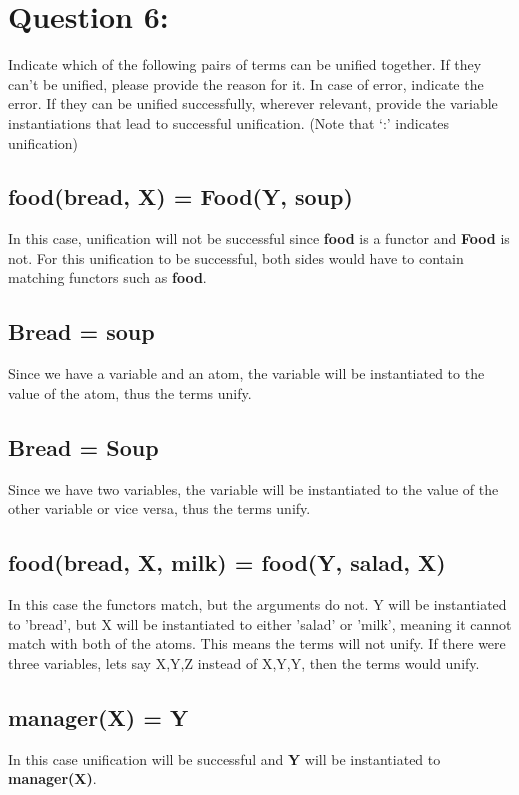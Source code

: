 \section{Question 6:}
Indicate which of the following pairs of terms can be uniﬁed together. If they can’t be uniﬁed, please provide the reason for it. In case of error, indicate the error. If they can be uniﬁed successfully, wherever relevant, provide the variable instantiations that lead to successful uniﬁcation. (Note that ‘:’ indicates uniﬁcation)

\subsection{food(bread, X) = Food(Y, soup)}
In this case, unification will not be successful since \textbf{food} is a functor and \textbf{Food} is not. For this unification to be successful, both sides would have to contain matching functors such as \textbf{food}.

\subsection{Bread = soup}
Since we have a variable and an atom, the variable will be instantiated to the value of the atom, thus the terms unify.

\subsection{Bread = Soup}
Since we have two variables, the variable will be instantiated to the value of the other variable or vice versa, thus the terms unify.

\subsection{food(bread, X, milk) = food(Y, salad, X)}
In this case the functors match, but the arguments do not. Y will be instantiated to 'bread', but X will be instantiated to either 'salad' or 'milk', meaning it cannot match with both of the atoms. This means the terms will not unify. If there were three variables, lets say X,Y,Z instead of X,Y,Y, then the terms would unify.

\subsection{manager(X) = Y}
In this case unification will be successful and \textbf{Y} will be instantiated to \textbf{manager(X)}.


